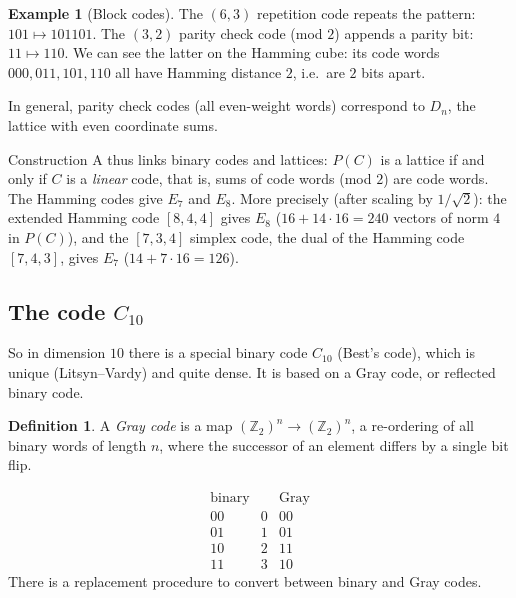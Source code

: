 \documentclass[11pt,openany]{book}
\theoremstyle{plain}
\theoremstyle{definition}
\newtheorem{definition}[theorem]{Definition}
\newtheorem{example}[theorem]{Example}
\theoremstyle{remark}
\newcommand{\added}[1]{{\color{addcol}#1}}
\newcommand{\Z}{\mathbb{Z}}
\begin{document}
\begin{example}[Block codes]
The $(6,3)$ repetition code repeats the pattern: $101\mapsto101101$. The $(3,2)$ parity check code
(mod $2$) appends a parity bit: $11\mapsto 110$. We can see the latter on the Hamming cube: its code
words $000,011,101,110$ all have Hamming distance $2$, i.e.\ are $2$ bits apart.
\begin{center}
\end{center}
In general, parity check codes (all even-weight words) correspond to $D_n$, the lattice with even
coordinate sums.
\end{example}

Construction A thus links binary codes and lattices: $P(C)$ is a lattice if and only if $C$ is a
\emph{linear} code, that is, sums of code words (mod $2$) are code words.
The Hamming codes give $E_7$ and $E_8$. \added{More precisely (after scaling by $1/\sqrt2$): the extended
Hamming code $[8,4,4]$ gives $E_8$ ($16+14\cdot16=240$ vectors of norm $4$ in $P(C)$), and the $[7,3,4]$
simplex code, the dual of the Hamming code $[7,4,3]$, gives $E_7$ ($14+7\cdot16=126$).}

\subsection*{The code \texorpdfstring{$C_{10}$}{C10}}
So in dimension $10$ there is a special binary code $C_{10}$ \added{(Best's code)}, which is unique
\added{(Litsyn--Vardy)} and quite dense. It is based on a Gray code, or reflected binary code.

\begin{definition}
A \emph{Gray code} is a map $(\Z_2)^n\to(\Z_2)^n$, \added{a re-ordering of all binary words of length $n$},
where the successor of an element differs by a single bit flip.
\end{definition}
\[
  \begin{array}{ccc}
    \text{binary} & & \text{Gray}\\ \hline
    00 & 0 & 00\\ 01 & 1 & 01\\ 10 & 2 & 11\\ 11 & 3 & 10
  \end{array}
\]
There is a replacement procedure to convert between binary and Gray codes.
\end{document}
